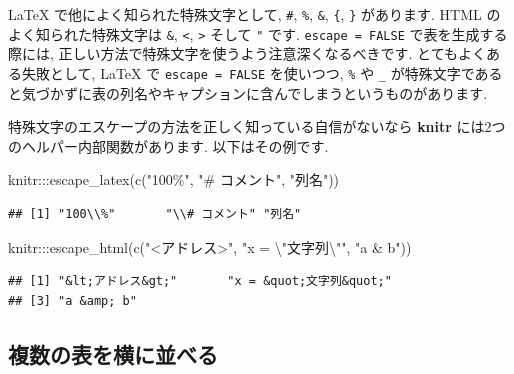 \documentclass[
  11pt,
  lualatex,ja=standard,jafont=noto]{bxjsreport}
\newenvironment{Shaded}{\begin{snugshade}}{\end{snugshade}}
\newcommand{\FunctionTok}[1]{\textcolor[rgb]{0.00,0.00,0.00}{#1}}
\newcommand{\NormalTok}[1]{#1}
\newcommand{\SpecialCharTok}[1]{\textcolor[rgb]{0.00,0.00,0.00}{#1}}
\newcommand{\StringTok}[1]{\textcolor[rgb]{0.31,0.60,0.02}{#1}}
\begin{document}
LaTeX で他によく知られた特殊文字として, \texttt{\#}, \texttt{\%}, \texttt{\&}, \texttt{\{}, \texttt{\}} があります. HTML のよく知られた特殊文字は \texttt{\&}, \texttt{\textless{}}, \texttt{\textgreater{}} そして \texttt{"} です. \texttt{escape = FALSE} で表を生成する際には, 正しい方法で特殊文字を使うよう注意深くなるべきです. とてもよくある失敗として, LaTeX で \texttt{escape = FALSE} を使いつつ, \texttt{\%} や \texttt{\_} が特殊文字であると気づかずに表の列名やキャプションに含んでしまうというものがあります.

特殊文字のエスケープの方法を正しく知っている自信がないなら \textbf{knitr} には2つのヘルパー内部関数があります. 以下はその例です.

\begin{Shaded}
\begin{Highlighting}[numbers=left,,]
\NormalTok{knitr}\SpecialCharTok{:::}\FunctionTok{escape\_latex}\NormalTok{(}\FunctionTok{c}\NormalTok{(}\StringTok{"100\%"}\NormalTok{, }\StringTok{"\# コメント"}\NormalTok{, }\StringTok{"列名"}\NormalTok{))}
\end{Highlighting}
\end{Shaded}

\begin{verbatim}
## [1] "100\\%"       "\\# コメント" "列名"
\end{verbatim}

\begin{Shaded}
\begin{Highlighting}[numbers=left,,]
\NormalTok{knitr}\SpecialCharTok{:::}\FunctionTok{escape\_html}\NormalTok{(}\FunctionTok{c}\NormalTok{(}\StringTok{"\textless{}アドレス\textgreater{}"}\NormalTok{, }\StringTok{"x = }\SpecialCharTok{\textbackslash{}"}\StringTok{文字列}\SpecialCharTok{\textbackslash{}"}\StringTok{"}\NormalTok{, }
  \StringTok{"a \& b"}\NormalTok{))}
\end{Highlighting}
\end{Shaded}

\begin{verbatim}
## [1] "&lt;アドレス&gt;"       "x = &quot;文字列&quot;"
## [3] "a &amp; b"
\end{verbatim}

\hypertarget{multiple-tables-siede-by-side}{%
\subsection{複数の表を横に並べる}\label{multiple-tables-siede-by-side}}
\end{document}
